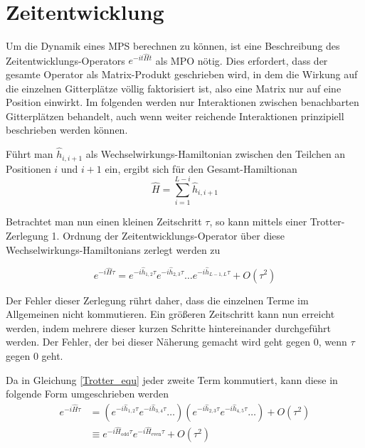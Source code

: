 \documentclass[10pt,a4paper]{report}
\begin{document}
\section{Zeitentwicklung}\label{tMPS}

Um die Dynamik eines MPS berechnen zu können, ist eine Beschreibung des Zeitentwicklungs-Operators $e^{-it\hat{H}t}$ als MPO nötig. Dies erfordert, dass der gesamte Operator als Matrix-Produkt geschrieben wird, in dem die Wirkung auf die einzelnen Gitterplätze völlig faktorisiert ist, also eine Matrix nur auf eine Position einwirkt. Im folgenden werden nur Interaktionen zwischen benachbarten Gitterplätzen behandelt, auch wenn weiter reichende Interaktionen prinzipiell beschrieben werden können.

Führt man $\hat{h}_{i,i+1}$ als Wechselwirkungs-Hamiltonian zwischen den Teilchen an Positionen $i$ und $i+1$ ein, ergibt sich für den Gesamt-Hamiltionan
\begin{equation}
\hat{H}=\sum_{i=1}^{L-i}\hat{h}_{i,i+1}
\end{equation}

Betrachtet man nun einen kleinen Zeitschritt $\tau$, so kann mittels einer Trotter-Zerlegung 1. Ordnung der Zeitentwicklungs-Operator über diese Wechselwirkungs-Hamiltonians zerlegt werden zu

\begin{equation}\label{Trotter_equ}
e^{-i\hat{H}\tau}= e^{-i\hat{h}_{1,2}\tau}e^{-i\hat{h}_{2,3}\tau}\ldots e^{-i\hat{h}_{L-1,L}\tau}+O(\tau^2)
\end{equation}

Der Fehler dieser Zerlegung rührt daher, dass die einzelnen Terme im Allgemeinen nicht kommutieren. Ein größeren Zeitschritt kann nun erreicht werden, indem mehrere dieser kurzen Schritte hintereinander durchgeführt werden. Der Fehler, der bei dieser Näherung gemacht wird geht gegen $0$, wenn $\tau$ gegen $0$ geht.

Da in Gleichung \ref{Trotter_equ} jeder zweite Term kommutiert, kann diese in folgende Form umgeschrieben werden
\begin{equation}
\begin{split}
e^{-i\hat{H}\tau}&=(e^{-i\hat{h}_{1,2}\tau}e^{-i\hat{h}_{3,4}\tau}\ldots)(e^{-i\hat{h}_{2,3}\tau}e^{-i\hat{h}_{4,5}\tau}\ldots)+O(\tau^2)\\
&\equiv e^{-i\hat{H}_{\text{odd}}\tau}e^{-i\hat{H}_{\text{even}}\tau}+O(\tau^2)
\end{split}
\end{equation}
\end{document}
